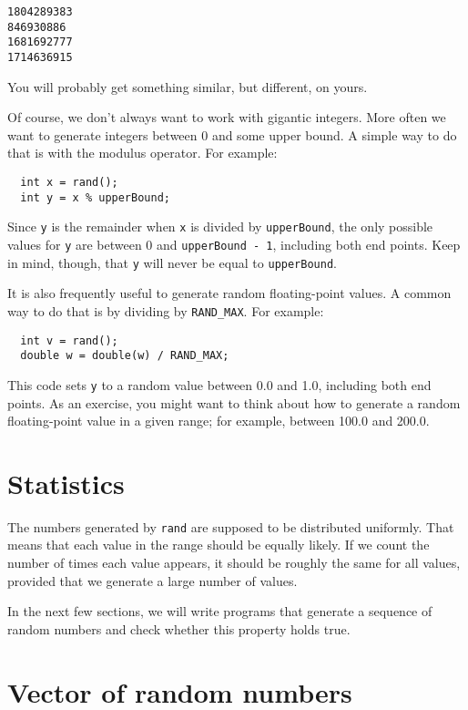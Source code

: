 \begin{verbatim}
1804289383
846930886
1681692777
1714636915
\end{verbatim}
%
You will probably get something similar, but different, on yours.

Of course, we don't always want to work with gigantic integers.
More often we want to generate integers between 0 and some
upper bound.  A simple way to do that is with the modulus
operator.  For example:

\begin{lstlisting}
  int x = rand();
  int y = x % upperBound;
\end{lstlisting}
%
Since {\tt y} is the remainder when {\tt x} is divided by
{\tt upperBound}, the only possible values for {\tt y}
are between 0 and {\tt upperBound - 1}, including both
end points.  Keep in mind, though, that {\tt y} will never
be equal to {\tt upperBound}.

It is also frequently useful to generate random floating-point values.
A common way to do that is by dividing by {\tt RAND\_MAX}.  For
example:

\begin{lstlisting}
  int v = rand();
  double w = double(w) / RAND_MAX;
\end{lstlisting}
%
This code sets {\tt y} to a random value between 0.0 and 1.0,
including both end points.  As an exercise, you might want to
think about how to generate a random floating-point value in
a given range; for example, between 100.0 and 200.0.

\section{Statistics}

The numbers generated by {\tt rand} are supposed to be distributed
uniformly.  That means that each value in the range should be
equally likely.  If we count the number of times each value appears,
it should be roughly the same for all values, provided that we
generate a large number of values.

In the next few sections, we will write programs that generate
a sequence of random numbers and check whether this property
holds true.

\section{Vector of random numbers}

